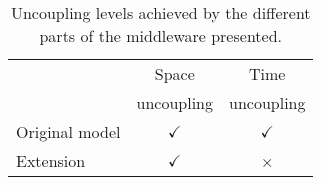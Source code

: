 
\begin{savenotes} %
  \begin{table}[htbp]
    \caption{Uncoupling levels achieved by the different parts of the middleware presented.}
    \begin{center}
      \begin{tabular}{lcc}
	~ & Space &	Time \\
	~ & uncoupling & uncoupling \\
	\hline
	Original model & $\checkmark$ & $\checkmark$ \\
	Extension & $\checkmark$ & × \\
	\hline
      \end{tabular}
    \end{center}
    \label{tab:middleware_coordinationprop}
  \end{table}
\end{savenotes}